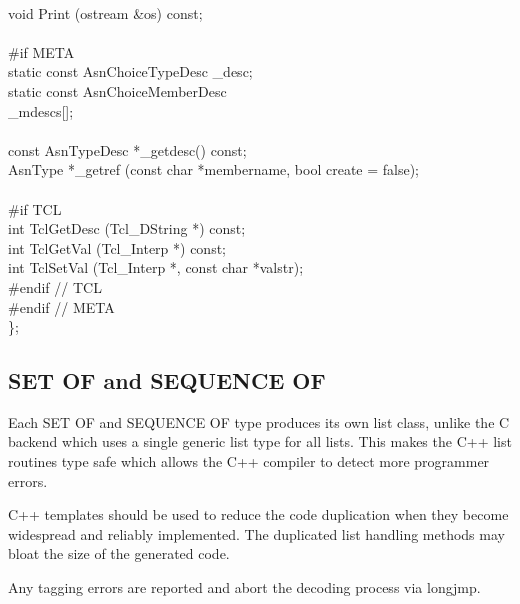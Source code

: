 \begin{Ccode}
\\
  void       \>\>Print (ostream \&os) const;\\
\\
\<\#if META\\
  static const AsnChoiceTypeDesc        \>\>\_desc;\\
  static const AsnChoiceMemberDesc      \\
					\>\>\_mdescs[];\\
\\
  const AsnTypeDesc             \>\>*\_getdesc() const;\\
  AsnType                       \>\>*\_getref (const char *membername, bool create = false);\\
\\
\<\#if TCL\\
  int                   \>\>TclGetDesc (Tcl\_DString *) const;\\
  int                   \>\>TclGetVal (Tcl\_Interp *) const;\\
  int                   \>\>TclSetVal (Tcl\_Interp *, const char *valstr);\\
\<\#endif // TCL\\
\<\#endif // META\\
\<\};
\end{Ccode}



\subsection{\label{C++-set-of-section}SET OF and SEQUENCE OF}

Each SET OF and SEQUENCE OF type produces its own list class, unlike
the C backend which uses a single generic list type for all lists.
This makes the C++ list routines type safe which allows the C++
compiler to detect more programmer errors.

C++ templates should be used to reduce the code duplication when they
become widespread and reliably implemented.  The duplicated list
handling methods may bloat the size of the generated code.

Any tagging errors are reported and abort the decoding process via
{\C longjmp}.

